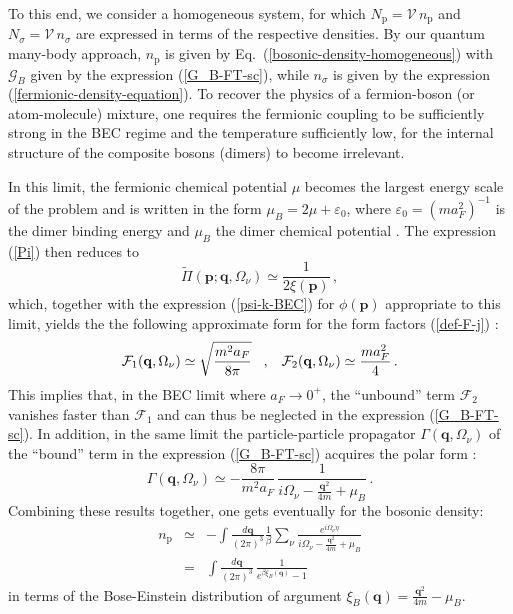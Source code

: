 \documentclass[pra,twocolumn,aps,amssymb,showpacs,superscriptaddress]{revtex4-1}
\begin{document}
To this end, we consider a homogeneous system, for which $N_{\mathrm{p}} = \mathcal{V} \, n_{\mathrm{p}}$ and $N_{\sigma} = \mathcal{V} \, n_{\sigma}$ are expressed in terms of the respective densities.
By our quantum many-body approach, $n_{\mathrm{p}}$ is given by Eq.~(\ref{bosonic-density-homogeneous}) with $\mathcal{G}_{B}$ given by the expression (\ref{G_B-FT-sc}), 
while $n_{\sigma}$ is given by the expression (\ref{fermionic-density-equation}).
To recover the physics of a fermion-boson (or atom-molecule) mixture, one requires the fermionic coupling to be sufficiently strong in the BEC regime and the temperature sufficiently low, for the internal structure of the composite bosons (dimers) to become irrelevant.

In this limit, the fermionic chemical potential $\mu$ becomes the largest energy scale of the problem and is written in the form $\mu_{B} = 2 \mu + \varepsilon_{0}$, where $\varepsilon_{0}= (m a_{F}^{2})^{-1}$ is the dimer binding energy and $\mu_{B}$ the dimer chemical potential \cite{Physics-Reports-2018}.
The expression (\ref{Pi}) then reduces to
\begin{equation}
\tilde{\Pi}(\mathbf{p};\mathbf{q},\Omega_{\nu}) \simeq \frac{1}{ 2 \xi(\mathbf{p})} \, ,
\label{Pi-BEC_limit}
\end{equation}
which, together with the expression (\ref{psi-k-BEC}) for $\phi({\mathbf p})$ appropriate to this limit, yields the the following approximate form for the form factors (\ref{def-F-j}) \cite{Andrenacci-2003}:
\begin{equation}
\mathcal{F}_{1}(\mathbf{q},\Omega_{\nu}) \simeq  \sqrt{\frac{m^{2} a_{F}}{8 \pi}} \hspace{0.3cm} , \hspace{0.3cm} \mathcal{F}_{2}(\mathbf{q},\Omega_{\nu}) \simeq  \frac{m a_{F}^{2}}{4} \, .
\label{approximate-form-factors}
\end{equation}
This implies that, in the BEC limit where $a_F \to 0^+$, the ``unbound'' term $\mathcal{F}_{2}$ vanishes faster than $\mathcal{F}_{1}$ and can thus be neglected in the expression (\ref{G_B-FT-sc}).
In addition, in the same limit the particle-particle propagator $\Gamma(\mathbf{q},\Omega_{\nu})$ of the ``bound'' term in the expression (\ref{G_B-FT-sc}) acquires the polar form \cite{Physics-Reports-2018}:
\begin{equation}
\Gamma(\mathbf{q},\Omega_{\nu}) \simeq - \frac{8 \pi}{m^{2} a_{F}} \, \frac{1}{i\Omega_{\nu} - \frac{\mathbf{q}^{2}}{4m} + \mu_{B}} \, .
\label{polar-particle-particel-propagator}
\end{equation}
Combining these results together, one gets eventually for the bosonic density:
\begin{eqnarray}
n_{\mathrm{p}} & \simeq & - \int \! \frac{d\mathbf{q}}{(2 \pi)^{3}} \frac{1}{\beta} \sum_{\nu} \frac{e^{i \Omega_{\nu} \eta}}{i\Omega_{\nu} - \frac{\mathbf{q}^{2}}{4m} + \mu_{B}} 
\nonumber \\
& = & \int \! \frac{d\mathbf{q}}{(2 \pi)^{3}} \, \frac{1}{e^{\beta \xi_{B}(\mathbf{q})} - 1}
\label{approximate-bosonic-density}
\end{eqnarray}
in terms of the Bose-Einstein distribution of argument $\xi_{B}(\mathbf{q}) = \frac{\mathbf{q}^{2}}{4m} - \mu_{B}$.
\end{document}
